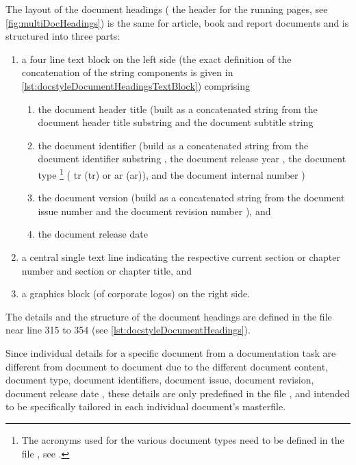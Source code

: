 The layout of the document headings (\IE{} the header for the running
pages, see \autoref{fig:multiDocHeadings}) is the same for article, book
and report documents and is structured into three parts:
\begin{enumerate}
\item a four line text block on the left side (the exact definition of the
  concatenation of the string components is given in
  \autoref{lst:docstyleDocumentHeadingsTextBlock}) comprising
  \begin{enumerate}
  \item the document header title (built as a concatenated string from the
    document header title substring \latexcmd{\ThisDocHeaderTitleSubstr}
    and the document subtitle string \latexcmd{\ThisDocSubtitle}
  \item the document identifier (build as a concatenated string from the
    document identifier substring \latexcmd{\ThisDocIdSubstr}, the document
    release year \latexcmd{\ThisDocYear}, the document type%
    \footnote{The acronyms used for the various document types need to be
      defined in the file , see
      .}
    \latexcmd{\ThisDocType} (\EG{} \acs{tr} (\acl{tr}) or \acs{ar}
    (\acl{ar})), and the document internal number
    \latexcmd{\ThisDocIntNum})
  \item the document version (build as a concatenated string from the
    document issue number \latexcmd{\ThisDocIssue} and the document
    revision number \latexcmd{\ThisDocRevision}), and
  \item the document release date
  \end {enumerate}
\item a central single text line indicating the respective current section
  or chapter number and section or chapter title, and
\item a graphics block (of corporate logos) on the right side.
\end{enumerate}

The details and the structure of the document headings are defined in the
file  near line 315 to 354 (see
\autoref{lst:docstyleDocumentHeadings}).

Since individual details for a specific document from a \multidoc
documentation task are different from document to document due to the
different document content, document type, document identifiers, document
issue, document revision, document release date \ETC{}, these details are
only predefined in the file , and intended to be
specifically tailored in each individual document's masterfile.

